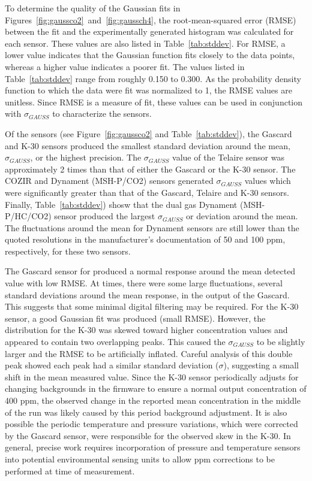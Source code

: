 \documentclass[sensors,article,submit,moreauthors,pdftex]{Definitions/mdpi}
\begin{document}
			To determine the quality of the Gaussian fits in Figures~\ref{fig:gaussco2}~and~\ref{fig:gaussch4}, the root-mean-squared error (RMSE) between the fit and the experimentally generated histogram was calculated for each sensor.
			These values are also listed in Table~\ref{tab:stddev}.
			For RMSE, a lower value indicates that the Gaussian function fits closely to the data points, whereas a higher value indicates a poorer fit.
			The values listed in Table~\ref{tab:stddev} range from roughly 0.150 to 0.300.
			As the probability density function to which the data were fit was normalized to 1, the RMSE values are unitless.
			Since RMSE is a measure of fit, these values can be used in conjunction with $\sigma_{GAUSS}$ to characterize the sensors.
			
			
			Of the  sensors (see Figure~\ref{fig:gaussco2} and Table~\ref{tab:stddev}), the Gascard and K-30 sensors produced the smallest standard deviation around the mean, $\sigma_{GAUSS}$, or the highest precision.
			The $\sigma_{GAUSS}$ value of the Telaire sensor was approximately 2 times than that of either the Gascard or the K-30 sensor.
			The COZIR and Dynament (MSH-P/CO2) sensors generated $\sigma_{GAUSS}$ values which were significantly greater than that of the Gascard, Telaire and K-30 sensors.
			Finally, Table~\ref{tab:stddev}) shosw that the dual gas Dynament (MSH-P/HC/CO2) sensor produced the largest $\sigma_{GAUSS}$ or deviation around the mean.
			The fluctuations around the mean for Dynament sensors are still lower than the quoted resolutions in the manufacturer's documentation of 50 and 100 ppm, respectively, for these two sensors.
			
			The Gascard sensor for  produced a normal response around the mean detected value with low RMSE.
			At times, there were some large fluctuations, several standard deviations around the mean response, in the output of the Gascard.
			This suggests that some minimal digital filtering may be required.
			For the K-30 sensor, a good Gaussian fit was produced (small RMSE).
			However, the distribution for the K-30 was skewed toward higher concentration values and appeared to contain two overlapping peaks.
			This caused the $\sigma_{GAUSS}$ to be slightly larger and the RMSE to be artificially inflated.
			Careful analysis of this double peak showed each peak had a similar standard deviation ($\sigma$), suggesting a small shift in the mean measured value.
			Since the K-30 sensor periodically adjusts for changing backgrounds in the firmware to ensure a normal output concentration of 400 ppm, the observed change in the reported mean concentration in the middle of the run was likely caused by this period background adjustment.
			It is also possible the periodic temperature and pressure variations, which were corrected by the Gascard sensor, were responsible for the observed skew in the K-30.
			In general, precise work requires incorporation of pressure and temperature sensors into potential environmental sensing units to allow ppm corrections to be performed at time of measurement.
			
\end{document}
